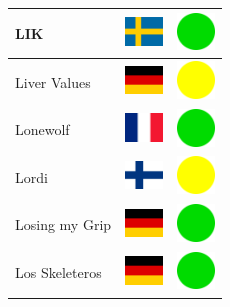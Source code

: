 \documentclass[12pt, a4paper, twoside]{report}
\begin{document}
\begin{center}
\begin{longtable}{|p{5cm}|p{2cm}|p{2cm}|}
LIK & \includegraphics[width=1cm]{4x3/se} & \includegraphics[width=1cm]{likes/y} \\ \hline
Liver Values & \includegraphics[width=1cm]{4x3/de} & \includegraphics[width=1cm]{likes/m} \\ \hline
Lonewolf & \includegraphics[width=1cm]{4x3/fr} & \includegraphics[width=1cm]{likes/y} \\ \hline
Lordi & \includegraphics[width=1cm]{4x3/fi} & \includegraphics[width=1cm]{likes/m} \\ \hline
Losing my Grip & \includegraphics[width=1cm]{4x3/de} & \includegraphics[width=1cm]{likes/y} \\ \hline
Los Skeleteros & \includegraphics[width=1cm]{4x3/de} & \includegraphics[width=1cm]{likes/y} \\ \hline

\end{longtable}
\end{center}
\end{document}
